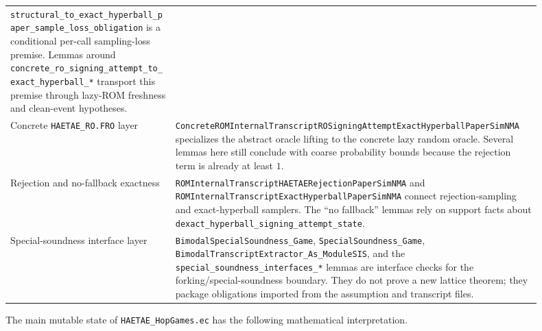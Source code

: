 \documentclass[11pt]{report}
\DeclareRobustCommand{\file}[1]{\ifmmode\text{\nolinkurl{#1}}\else\nolinkurl{#1}\fi}
\DeclareRobustCommand{\ec}[1]{\ifmmode\text{\nolinkurl{#1}}\else\nolinkurl{#1}\fi}
\theoremstyle{definition}
\theoremstyle{plain}
\begin{document}
\begin{longtable}{p{0.28\linewidth}p{0.62\linewidth}}
\ec{structural\_to\_exact\_hyperball\_paper\_sample\_loss\_obligation} is a
conditional per-call sampling-loss premise.  Lemmas around
\ec{concrete\_ro\_signing\_attempt\_to\_exact\_hyperball\_*} transport this
premise through lazy-ROM freshness and clean-event hypotheses. \\
Concrete \ec{HAETAE\_RO.FRO} layer &
\ec{ConcreteROMInternalTranscriptROSigningAttemptExactHyperballPaperSimNMA}
specializes the abstract oracle lifting to the concrete lazy random oracle.
Several lemmas here still conclude with coarse probability bounds because the
rejection term is already at least \(1\). \\
Rejection and no-fallback exactness &
\ec{ROMInternalTranscriptHAETAERejectionPaperSimNMA} and
\ec{ROMInternalTranscriptExactHyperballPaperSimNMA} connect rejection-sampling
and exact-hyperball samplers.  The ``no fallback'' lemmas rely on support facts
about \ec{dexact\_hyperball\_signing\_attempt\_state}. \\
Special-soundness interface layer &
\ec{BimodalSpecialSoundness\_Game}, \ec{SpecialSoundness\_Game},
\ec{BimodalTranscriptExtractor\_As\_ModuleSIS}, and the
\ec{special\_soundness\_interfaces\_*} lemmas are interface checks for the
forking/special-soundness boundary.  They do not prove a new lattice theorem;
they package obligations imported from the assumption and transcript files. \\
\bottomrule
\end{longtable}

The main mutable state of \file{HAETAE\_HopGames.ec} has the following
mathematical interpretation.
\end{document}
